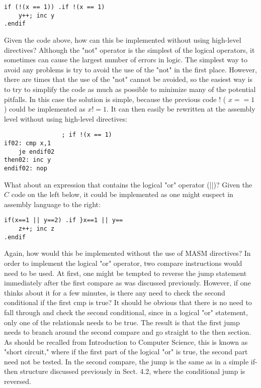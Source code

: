 \documentclass[10pt]{article}
\begin{document}
\begin{verbatim}
if (!(x == 1)) .if !(x == 1)
    y++; inc y
.endif
\end{verbatim}

Given the code above, how can this be implemented without using high-level directives? Although the "not" operator is the simplest of the logical operators, it sometimes can cause the largest number of errors in logic. The simplest way to avoid any problems is try to avoid the use of the "not" in the first place. However, there are times that the use of the "not" cannot be avoided, so the easiest way is to try to simplify the code as much as possible to minimize many of the potential pitfalls. In this case the solution is simple, because the previous code ! ( $x==1$ ) could be implemented as $x!=1$. It can then easily be rewritten at the assembly level without using high-level directives:

\begin{verbatim}
                ; if !(x == 1)
if02: cmp x,1
    je endif02
then02: inc y
endif02: nop
\end{verbatim}

What about an expression that contains the logical "or" operator (||)? Given the $C$ code on the left below, it could be implemented as one might suspect in assembly language to the right:

\begin{verbatim}
if(x==1 || y==2) .if }x==1 || y==
    z++; inc z
.endif
\end{verbatim}

Again, how would this be implemented without the use of MASM directives? In order to implement the logical "or" operator, two compare instructions would need to be used. At first, one might be tempted to reverse the jump statement immediately after the first compare as was discussed previously. However, if one thinks about it for a few minutes, is there any need to check the second conditional if the first cmp is true? It should be obvious that there is no need to fall through and check the second conditional, since in a logical "or" statement, only one of the relationals needs to be true. The result is that the first jump needs to branch around the second compare and go straight to the then section. As should be recalled from Introduction to Computer Science, this is known as "short circuit," where if the first part of the logical "or" is true, the second part need not be tested. In the second compare, the jump is the same as in a simple if-then structure discussed previously in Sect. 4.2, where the conditional jump is reversed.
\end{document}
